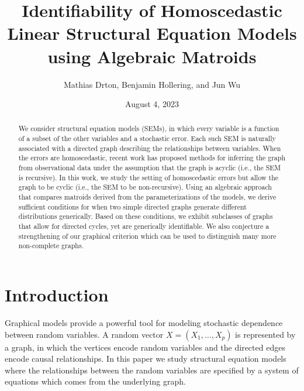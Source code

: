 \documentclass[12pt,reqno]{amsart}
\title[Identifiability of linear SEMs using Algebraic Matroids]{Identifiability of Homoscedastic Linear Structural Equation Models using Algebraic Matroids}
\author{Mathias Drton, Benjamin Hollering, and Jun Wu}
\date{August 4, 2023}
\theoremstyle{plain}
\theoremstyle{definition}
\begin{document}
\begin{abstract}
We consider structural equation models (SEMs), in which every variable is a function of a subset of the other variables and a stochastic error. Each such SEM is naturally associated with a directed graph describing the relationships between variables. When the errors are homoscedastic, recent work has proposed methods for inferring the graph from observational data under the assumption that the graph is acyclic (i.e., the SEM is recursive). In this work, we study the setting of homoscedastic errors but allow the graph to be cyclic (i.e., the SEM to be non-recursive). Using an algebraic approach that compares matroids derived from the parameterizations of the models, we derive sufficient conditions for when two simple directed graphs generate different distributions generically. Based on these conditions, we exhibit subclasses of graphs that allow for directed cycles, yet are generically identifiable. We also conjecture a strengthening of our graphical criterion which can be used to distinguish many more non-complete graphs.  
\end{abstract}

\maketitle

\section{Introduction}
Graphical models provide a powerful tool for modeling stochastic dependence between random variables. A random vector $X=(X_1,\dots, X_p)$ is represented by a graph, in which the vertices encode random variables and the directed edges encode causal relationships. In this paper we study structural equation models where the relationships between the random variables are specified by a system of equations which comes from the underlying graph.
\end{document}
